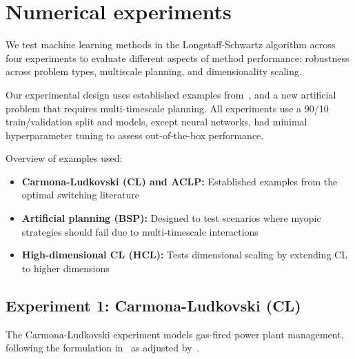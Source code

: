 \documentclass[11pt,reqno,a4paper]{amsart}
\theoremstyle{definition}
\numberwithin{equation}{section}
\DeclareMathOperator{\1}{\mathbbm{1}}
\begin{document}
\section{Numerical experiments} \label{sec:numerical}

We test machine learning methods in the Longstaff-Schwartz algorithm across four experiments to evaluate different aspects of method performance: robustness across problem types, multiscale planning, and dimensionality scaling.

Our experimental design uses established examples from~\cite{carmona2008pricing,ACLP12,bayraktar2023neural}, and a new artificial problem that requires multi-timescale planning. All experiments use a 90/10 train/validation split and models, except neural networks, had minimal hyperparameter tuning to assess out-of-the-box performance.

Overview of examples used:
\begin{itemize}
  \item \textbf{Carmona-Ludkovski (CL) and ACLP:} Established examples from the optimal switching literature
  \item \textbf{Artificial planning (BSP):} Designed to test scenarios where myopic strategies should fail due to multi-timescale interactions
  \item \textbf{High-dimensional CL (HCL):} Tests dimensional scaling by extending CL to higher dimensions
\end{itemize}
\subsection{Experiment 1: Carmona-Ludkovski (CL)} \label{sec:numerical:carmona}
The Carmona-Ludkovski experiment models gas-fired power plant management, following the formulation in~\cite{carmona2008pricing} as adjusted by~\cite{bayraktar2023neural}.
\end{document}
